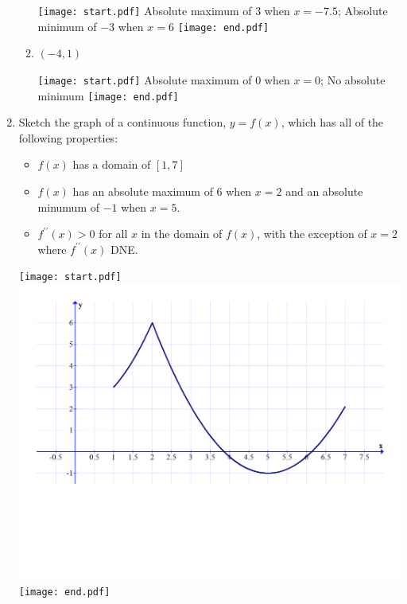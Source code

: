 \documentclass[12pt]{article}
\begin{document}
\begin{enumerate}
\begin{enumerate}
\texttt{[image: start.pdf]}
{{Absolute maximum of $3$ when $x=-7.5$; Absolute minimum of $-3$ when $x=6$}}
\texttt{[image: end.pdf]}


\item $(-4,1)$

\texttt{[image: start.pdf]}
{{Absolute maximum of 0 when $x=0$; No absolute minimum}}
\texttt{[image: end.pdf]}


\end{enumerate}

\item Sketch the graph of a continuous function, $y=f(x)$, which has all of the following properties:

\begin{itemize}

\item $f(x)$ has a domain of $[1,7]$

\item $f(x)$ has an absolute maximum of 6 when $x=2$ and an absolute minumum of $-1$ when $x=5$.

\item $f^{\prime \prime}(x)>0$ for all $x$ in the domain of $f(x)$, with the exception of $x=2$ where $f^{\prime \prime}(x)$ DNE.

\end{itemize}

\texttt{[image: start.pdf]}
{{\includegraphics[scale=0.3]{graph2.pdf}}}
\texttt{[image: end.pdf]}


\end{enumerate}

\end{document}
